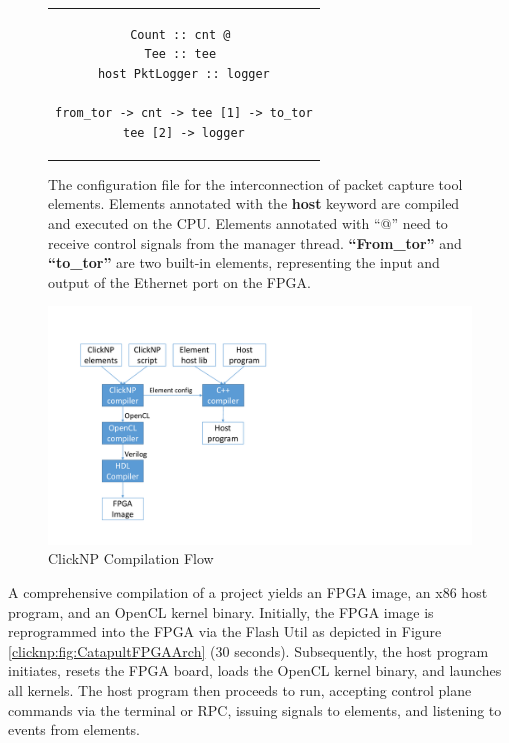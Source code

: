\begin{figure}[htbp]
\small
\centering
\begin{tabular}{c}
\begin{lstlisting}
Count :: cnt @ 
Tee :: tee 
host PktLogger :: logger

from_tor -> cnt -> tee [1] -> to_tor
tee [2] -> logger
\end{lstlisting}
\end{tabular}
	\caption{The \name configuration file for the interconnection of packet capture tool elements. Elements annotated with the \textbf {host} keyword are compiled and executed on the CPU. Elements annotated with ``@'' need to receive control signals from the manager thread. \textbf {``From\_tor''} and \textbf {``to\_tor''} are two built-in elements, representing the input and output of the Ethernet port on the FPGA.}
	\label{clicknp:fig:logger-config}
\end{figure}

\iffalse
\begin{figure}[!t]
	\centering
	\includegraphics[width=0.8\columnwidth]{image/ClickNPSoftware}
	\vspace{-0.15in}
	\caption{ClickNP Compilation Flow}
	\vspace{-0.15in}
	\label{clicknp:fig:ClickNPSoftware}
\end{figure}

A comprehensive compilation of a project yields an FPGA image, an x86 host program, and an OpenCL kernel binary. Initially, the FPGA image is reprogrammed into the FPGA via the Flash Util as depicted in Figure \ref{clicknp:fig:CatapultFPGAArch} (30 seconds). Subsequently, the host program initiates, resets the FPGA board, loads the OpenCL kernel binary, and launches all kernels. The host program then proceeds to run, accepting control plane commands via the terminal or RPC, issuing signals to elements, and listening to events from elements.

